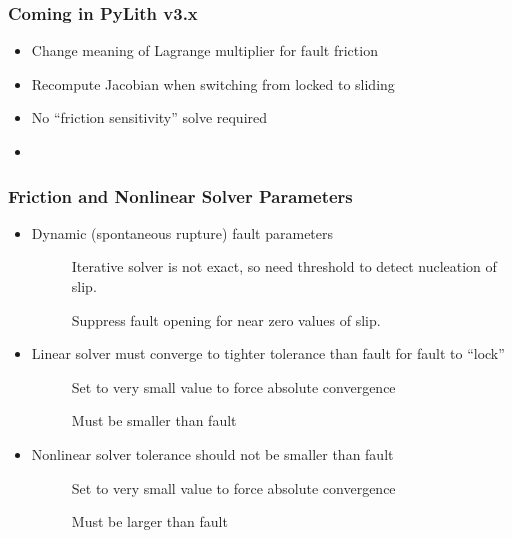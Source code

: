 \documentclass[aspectratio=169]{beamer}
\begin{document}
\begin{frame}
  \frametitle{Coming in PyLith v3.x}

  \begin{itemize}
  \item Change meaning of Lagrange multiplier for fault friction
  \item Recompute Jacobian when switching from locked to sliding
  \item No ``friction sensitivity'' solve required
  \item {}
  \end{itemize}

\end{frame}


\begin{frame}
  \frametitle{Friction and Nonlinear Solver Parameters}

  \begin{itemize}
  \item Dynamic (spontaneous rupture) fault parameters
    \begin{description}
    \item[] Iterative solver is not exact,
      so need threshold to detect nucleation of slip.
    \item[] Suppress fault opening
      for near zero values of slip.
    \end{description}
  \item Linear solver must converge to tighter tolerance than fault
     for fault to ``lock''
    \begin{description}
    \item[] Set to very small value to force
      absolute convergence
    \item[] Must be smaller than fault
    \end{description}
  \item Nonlinear solver tolerance should not be smaller than
    fault 
    \begin{description}
    \item[] Set to very small value to force
      absolute convergence
    \item[] Must be larger than fault
    \end{description}
  \end{itemize}    

\end{frame}
\end{document}
